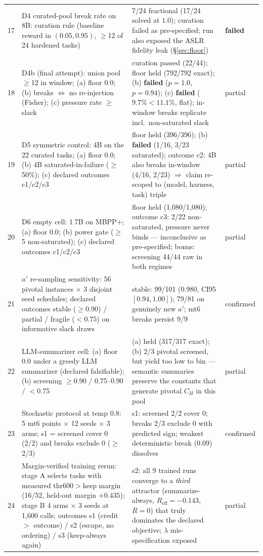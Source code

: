 \documentclass{article}
\theoremstyle{remark}
\begin{document}
\begin{table}[h]
{\begin{tabular}{clll}
17 & D4 curated-pool break rate on 8B: curation rule (baseline reward in $(0.05,0.95)$, $\geq$12 of 24 hardened tasks) & 7/24 fractional (17/24 solved at $1.0$); curation failed as pre-specified; run also exposed the ASLR fidelity leak (\S\ref{sec:floor}) & \textbf{failed} \\
18 & D4b (final attempt): union pool $\geq$12 in window; (a) floor $0.0$; (b) breaks $\Leftrightarrow$ no re-injection (Fisher); (c) pressure rate $\geq$ slack & curation passed (22/44); floor held (792/792 exact); (b) \textbf{failed} ($p=1.0$, $p=0.94$); (c) \textbf{failed} ($9.7\%<11.1\%$, flat); in-window breaks replicate incl.\ non-saturated slack & partial \\
19 & D5 symmetric control: 4B on the 22 curated tasks; (a) floor $0.0$; (b) 4B saturated-in-failure ($\geq$50\%); (c) declared outcomes c1/c2/c3 & floor held (396/396); (b) \textbf{failed} (1/16, 3/23 saturated); outcome c2: 4B also breaks in-window (4/16, 2/23) $\Rightarrow$ claim re-scoped to (model, harness, task) triple & partial \\
20 & D6 empty cell: 1.7B on MBPP+; (a) floor $0.0$; (b) power gate ($\geq$5 non-saturated); (c) declared outcomes c1/c2/c3 & floor held (1{,}080/1{,}080); outcome c3: 2/22 non-saturated, pressure never binds --- inconclusive as pre-specified; bonus: screening 44/44 raw in both regimes & partial \\
21 & $a'$ re-sampling sensitivity: 56 pivotal instances $\times$ 3 disjoint seed schedules; declared outcomes stable ($\geq 0.90$) / partial / fragile ($<0.75$) on informative slack draws & stable: 99/101 (0.980, CI95 $[0.94,1.00]$); 79/81 on genuinely new $a'$; mt6 breaks persist 9/9 & confirmed \\
22 & LLM-summarizer cell: (a) floor $0.0$ under a greedy LLM summarizer (declared falsifiable); (b) screening $\geq$0.90 / 0.75--0.90 / $<$0.75 & (a) held (317/317 exact); (b) 2/3 pivotal screened, but yield too low to bin --- semantic summaries preserve the constants that generate pivotal $C_H$ in this pool & partial \\
23 & Stochastic protocol at temp $0.8$: 5 mt6 points $\times$ 12 seeds $\times$ 3 arms; s1 = screened cover 0 (2/2) and breaks exclude 0 ($\geq$2/3) & s1: screened 2/2 cover 0; breaks 2/3 exclude 0 with predicted sign; weakest deterministic break ($0.09$) dissolves & confirmed \\
24 & Margin-verified training rerun: stage A selects tasks with measured thr600$>$keep margin (16/52, held-out margin $+0.435$); stage B 4 arms $\times$ 3 seeds at 1{,}600 calls; outcomes s1 (credit $>$ outcome) / s2 (escape, no ordering) / s3 (keep-always again) & s2: all 9 trained runs converge to a \emph{third} attractor (summarize-always, $R_{\text{eff}}=-0.143$, $R=0$) that truly dominates the declared objective; $\lambda$ mis-specification exposed & partial \\

\end{tabular}}
\end{table}
\end{document}
